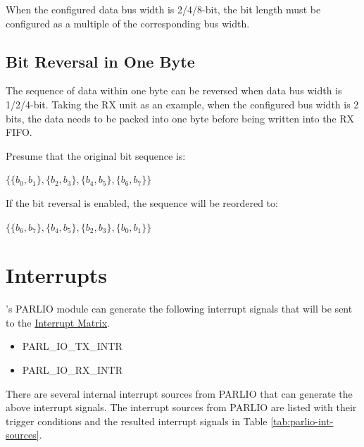 \documentclass[main\_\_EN.tex]{subfiles}
\begin{document}
When the configured data bus width is 2/4/8-bit, the bit length must be configured as a multiple of the corresponding bus width.


\subsection{Bit Reversal in One Byte}

The sequence of data within one byte can be reversed when data bus width is 1/2/4-bit. Taking the RX unit as an example, when the configured bus width is 2 bits, the data needs to be packed into one byte before being written into the RX FIFO.

Presume that the original bit sequence is:

\begin{center}
$\{ \{ b_{0}, b_{1} \}, \{ b_{2}, b_{3} \}, \{ b_{4}, b_{5} \}, \{ b_{6}, b_{7} \} \}$
\end{center}

If the bit reversal is enabled, the sequence will be reordered to:

\begin{center}
$\{ \{ b_{6}, b_{7} \}, \{ b_{4}, b_{5} \}, \{ b_{2}, b_{3} \}, \{ b_{0}, b_{1} \} \}$
\end{center}



\section{Interrupts} \label{sec:parlio-interrupts}

\chipname{}'s PARLIO module can generate the following interrupt signals that will be sent to the \hyperref[mod:intmtrx]{Interrupt Matrix}.

    \begin{itemize}
        \item PARL\_IO\_TX\_INTR
        \item PARL\_IO\_RX\_INTR
    \end{itemize}

There are several internal interrupt sources from PARLIO that can generate the above interrupt signals. The interrupt sources from PARLIO are listed with their trigger conditions and the resulted interrupt signals in Table \ref{tab:parlio-int-sources}.
\end{document}
